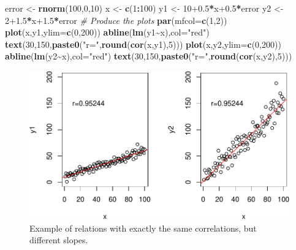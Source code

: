 \documentclass[
]{book}
\newenvironment{Shaded}{\begin{snugshade}}{\end{snugshade}}
\newcommand{\CommentTok}[1]{\textcolor[rgb]{0.56,0.35,0.01}{\textit{#1}}}
\newcommand{\DataTypeTok}[1]{\textcolor[rgb]{0.13,0.29,0.53}{#1}}
\newcommand{\DecValTok}[1]{\textcolor[rgb]{0.00,0.00,0.81}{#1}}
\newcommand{\FloatTok}[1]{\textcolor[rgb]{0.00,0.00,0.81}{#1}}
\newcommand{\KeywordTok}[1]{\textcolor[rgb]{0.13,0.29,0.53}{\textbf{#1}}}
\newcommand{\NormalTok}[1]{#1}
\newcommand{\OperatorTok}[1]{\textcolor[rgb]{0.81,0.36,0.00}{\textbf{#1}}}
\newcommand{\StringTok}[1]{\textcolor[rgb]{0.31,0.60,0.02}{#1}}
\theoremstyle{definition}
\theoremstyle{definition}
\theoremstyle{definition}
\theoremstyle{definition}
\theoremstyle{remark}
\begin{document}
\begin{Shaded}
\begin{Highlighting}[]
\NormalTok{error \textless{}{-}}\StringTok{ }\KeywordTok{rnorm}\NormalTok{(}\DecValTok{100}\NormalTok{,}\DecValTok{0}\NormalTok{,}\DecValTok{10}\NormalTok{)}
\NormalTok{x \textless{}{-}}\StringTok{ }\KeywordTok{c}\NormalTok{(}\DecValTok{1}\OperatorTok{:}\DecValTok{100}\NormalTok{)}
\NormalTok{y1 \textless{}{-}}\StringTok{ }\DecValTok{10}\FloatTok{+0.5}\OperatorTok{*}\NormalTok{x}\FloatTok{+0.5}\OperatorTok{*}\NormalTok{error}
\NormalTok{y2 \textless{}{-}}\StringTok{ }\DecValTok{2}\FloatTok{+1.5}\OperatorTok{*}\NormalTok{x}\FloatTok{+1.5}\OperatorTok{*}\NormalTok{error}
\CommentTok{\# Produce the plots}
\KeywordTok{par}\NormalTok{(}\DataTypeTok{mfcol=}\KeywordTok{c}\NormalTok{(}\DecValTok{1}\NormalTok{,}\DecValTok{2}\NormalTok{))}
\KeywordTok{plot}\NormalTok{(x,y1,}\DataTypeTok{ylim=}\KeywordTok{c}\NormalTok{(}\DecValTok{0}\NormalTok{,}\DecValTok{200}\NormalTok{))}
\KeywordTok{abline}\NormalTok{(}\KeywordTok{lm}\NormalTok{(y1}\OperatorTok{\textasciitilde{}}\NormalTok{x),}\DataTypeTok{col=}\StringTok{"red"}\NormalTok{)}
\KeywordTok{text}\NormalTok{(}\DecValTok{30}\NormalTok{,}\DecValTok{150}\NormalTok{,}\KeywordTok{paste0}\NormalTok{(}\StringTok{"r="}\NormalTok{,}\KeywordTok{round}\NormalTok{(}\KeywordTok{cor}\NormalTok{(x,y1),}\DecValTok{5}\NormalTok{)))}
\KeywordTok{plot}\NormalTok{(x,y2,}\DataTypeTok{ylim=}\KeywordTok{c}\NormalTok{(}\DecValTok{0}\NormalTok{,}\DecValTok{200}\NormalTok{))}
\KeywordTok{abline}\NormalTok{(}\KeywordTok{lm}\NormalTok{(y2}\OperatorTok{\textasciitilde{}}\NormalTok{x),}\DataTypeTok{col=}\StringTok{"red"}\NormalTok{)}
\KeywordTok{text}\NormalTok{(}\DecValTok{30}\NormalTok{,}\DecValTok{150}\NormalTok{,}\KeywordTok{paste0}\NormalTok{(}\StringTok{"r="}\NormalTok{,}\KeywordTok{round}\NormalTok{(}\KeywordTok{cor}\NormalTok{(x,y2),}\DecValTok{5}\NormalTok{)))}
\end{Highlighting}
\end{Shaded}

\begin{figure}
\centering
\includegraphics{Svetunkov---Statistics-for-Business-Analytics_files/figure-latex/correlationsScatterplotExample-1.pdf}
\caption{\label{fig:correlationsScatterplotExample}Example of relations with exactly the same correlations, but different slopes.}
\end{figure}
\end{document}
